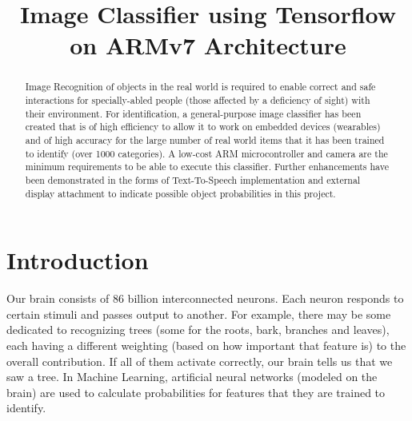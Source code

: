 \documentclass[a4paper,conference]{IEEEtran}
\begin{document}
	
	\title{Image Classifier using Tensorflow on ARMv7 Architecture}
	
	\author{
	\and
	}
	
	
	\maketitle
	
	\begin{abstract}
	
	Image Recognition of objects in the real world is required to enable correct and safe interactions for specially-abled people (those affected by a deficiency of sight) with their environment. For identification, a general-purpose image classifier has been created that is of high efficiency to allow it to work on embedded devices (wearables) and of high accuracy for the large number of real world items that it has been trained to identify (over 1000 categories). A low-cost ARM microcontroller and camera are the minimum requirements to be able to execute this classifier. Further enhancements have been demonstrated in the forms of Text-To-Speech implementation and external display attachment to indicate possible object probabilities in this project.
	
	\end{abstract} 
	
	\section{Introduction} \label{Introduction}
	 
	Our brain consists of 86 billion interconnected neurons. Each neuron responds to certain stimuli and passes output to another. For example, there may be some dedicated to recognizing trees (some for the roots, bark, branches and leaves), each having a different weighting (based on how important that feature is) to the overall contribution. If all of them activate correctly, our brain tells us that we saw a tree. In Machine Learning, artificial neural networks (modeled on the brain) are used to calculate probabilities for features that they are trained to identify.
\end{document}

